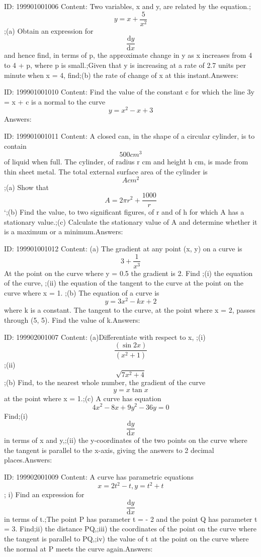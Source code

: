 \documentclass{article}
\begin{document}
ID: 199901001006
Content:
Two variables, x and y, are related by the equation.; \[y=x+\frac{5}{x^{2}}\];(a)	Obtain an expression for \[\frac{\mathrm{d} y}{\mathrm{d} x}\]and hence find, in terms of p, the approximate change in y as x increases from 4 to 4 + p, where p is small.;Given that y is increasing at a rate of 2.7 units per minute when x = 4, find;(b)	the rate of change of x at this instant.Answers:

ID: 199901001010
Content:
Find the value of the constant c for which the line 3y = x + c is a normal to the curve \[y=x^2-x+3\]Answers:

ID: 199901001011
Content:
A closed can, in the shape of a circular cylinder, is to contain \[500cm^3\] of liquid when full. The cylinder, of radius r cm and height h cm, is made from thin sheet metal. The total external surface area of the cylinder is \[A cm^2\] ;(a) Show that \[A=2\pi r^2+\frac{1000}{r}\] `;(b) Find the value, to two significant figures, of r and of h for which A has a stationary value.;(c) Calculate the stationary value of A and determine whether it is a maximum or a minimum.Answers:

ID: 199901001012
Content:
(a)	The gradient at any point (x, y) on a curve is \[3+\frac{1}{x^{3}}\] At the point on the curve where y = 0.5 the gradient is 2. Find ;(i)	the equation of the curve, ;(ii)	the equation of the tangent to the curve at the point on the curve where x = 1. ;(b) The equation of a curve is \[y=3x^2-kx+2\] where k is a constant. The tangent to the curve, at the point where x = 2, passes through (5, 5). Find the value of k.Answers:

ID: 199902001007
Content:
(a)Differentiate with respect to x, ;(i) \[\frac{(\sin2x)}{(x^2+1)}\];(ii) \[\sqrt{7x^2+4}\];(b)	Find, to the nearest whole number, the gradient of the curve \[y = x \tan x \] at the point where x = 1.;(c) A curve has equation \[4x^2-8x+9y^2-36y=0\] Find;(i) \[\frac{\mathrm{d} y}{\mathrm{d} x}\]in terms of x and y,;(ii) the y-coordinates of the two points on the curve where the tangent is parallel to the x-axis, giving the answers to 2 decimal places.Answers:

ID: 199902001009
Content:
A curve has parametric equations \[x=2t^2-t, y=t^2+t\];  i) Find an expression for \[\frac{\mathrm{d} y}{\mathrm{d} x}\]  in terms of t.;The point P has parameter t = - 2 and the point Q has parameter t = 3. Find;ii) the distance PQ,;iii) the coordinates of the point on the curve where the tangent is parallel to PQ,;iv) the value of t at the point on the curve where the normal at P meets the curve again.Answers:
\end{document}
